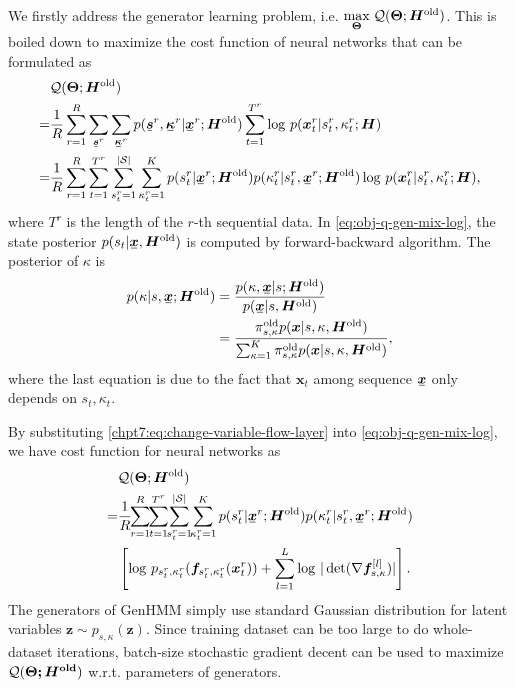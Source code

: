 We firstly address the generator learning problem, i.e. $\underset{\bm{\Theta}}{\max}\; \mathcal{Q}(\bm{\Theta}; \bm{H}^{\mathrm{old}})$. This is boiled down to maximize the cost function of neural networks that can be formulated as
\begin{align}\label{eq:obj-q-gen-mix-log}
  &\Qq(\bm{\Theta}; \bm{H}^{\mathrm{old}}) \nonumber \\
  = &\frac{1}{R}\sum_{r=1}^{R}\sum_{\ubmr{s}{r}}\sum_{\ubmr{\kappa}{r}}{p(\ubmr{s}{r}, \ubmr{\kappa}{r}| \ubmr{x}{r}; \bm{H}^{\mathrm{old}})} \sum_{t=1}^{{T}^{r}}\log\,p(\bmtr{x}{t}{r} | \smtr{s}{t}{r}, \smtr{\kappa}{t}{r}; \bm{H}) \nonumber \\
  =& \frac{1}{R}\sum_{r=1}^{R} \sum_{t=1}^{{T}^{r}} \sum_{\smtr{s}{t}{r}=1}^{|\Ss|}  \sum_{\smtr{\kappa}{t}{r}=1}^{K}p(\smtr{s}{t}{r}| \ubmr{x}{r}; \bm{H}^{\mathrm{old}})p(\smtr{\kappa}{t}{r}|\smtr{s}{t}{r}, \ubmr{x}{r}; \bm{H}^{\mathrm{old}})  \log\, p(\bmtr{x}{t}{r} | \smtr{s}{t}{r}, \smtr{\kappa}{t}{r}; \bm{H}), 
\end{align}
where $T^r$ is the length of the $r$-th sequential data. In \eqref{eq:obj-q-gen-mix-log}, the state posterior $p(s_t| \ubm{x}, \bm{H}^{\mathrm{old}})$ is computed by forward-backward algorithm. The posterior of $\kappa$ is
\begin{align}\label{eq:kappa-posterior}
  p(\kappa| s, \ubm{x}; \bm{H}^{\mathrm{old}})
  &=  \frac{p(\kappa, \ubm{x}| s; \bm{H}^{\mathrm{old}})}{p(\ubm{x}| s,\bm{H}^{\mathrm{old}})} \nonumber \\
  & = \frac{\pi_{s, \kappa}^{\mathrm{old}} p(\bm{x}| s, \kappa, \bm{H}^{\mathrm{old}})}{\sum_{\kappa=1}^{K}  \pi_{s, \kappa}^{\mathrm{old}} p(\bm{x}| s, \kappa,\bm{H}^{\mathrm{old}})},
\end{align}
where the last equation is due to the fact that $\bm{x}_t$ among sequence $\ubm{x}$ only depends on $s_t, \kappa_t$. 

By substituting \eqref{chpt7:eq:change-variable-flow-layer} into \eqref{eq:obj-q-gen-mix-log}, we have cost function for neural networks as
\begin{align}\label{eq:obj-q-gen-mix}
  &\Qq(\bm{\Theta}; \bm{H}^{\mathrm{old}}) \nonumber \\
  =& \frac{1}{R}\hspace{-3pt}\sum_{r=1}^{R}\hspace{-3pt} \sum_{t=1}^{{T}^{r}}\hspace{-3pt} \sum_{\smtr{s}{t}{r}=1}^{|\Ss|} \hspace{-3pt} \sum_{\smtr{\kappa}{t}{r}=1}^{K}p(\smtr{s}{t}{r}| \ubmr{x}{r}; \bm{H}^{\mathrm{old}})p(\smtr{\kappa}{t}{r}|\smtr{s}{t}{r}, \ubmr{x}{r}; \bm{H}^{\mathrm{old}}) \nonumber\\
  &\left[ \log\, p_{\smtr{s}{t}{r}, \smtr{\kappa}{t}{r}}(\bm{f}_{\smtr{s}{t}{r}, \smtr{\kappa}{t}{r}}(\bmtr{x}{t}{r})) + \sum_{l=1}^{L}\log\,| \det (\nabla{\bm{f}_{s,\kappa}^{[l]}})|\right].
\end{align}
The generators of GenHMM simply use standard Gaussian distribution for latent variables $\bm{z} \sim p_{s,\kappa}(\bm{z})$. Since training dataset can be too large to do whole-dataset iterations, batch-size stochastic gradient decent can be used to maximize $\mathcal{Q}(\bm{\Theta; \bm{H}^{\mathrm{old}}})$ w.r.t. parameters of generators.

